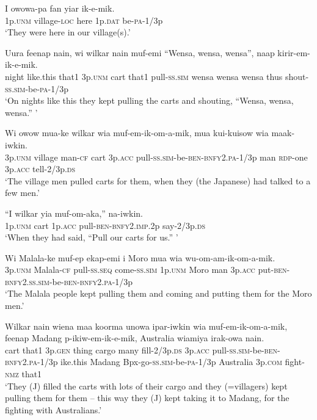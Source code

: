 \ea
\gll  I  owowa-pa  fan  yiar  ik-e-mik. \\
1p.\textsc{unm}  village-\textsc{loc}  here  1p.\textsc{dat}  be-\textsc{pa}-1/3p \\
\glt ‘They were here in our village(s).’ \\
\z


\ea
\gll  Uura  feenap  nain,  wi  wilkar  nain  muf-emi “Wensa,  wensa,  wensa”,  naap  kirir-em-ik-e-mik.\\
night  like.this  that1  3p.\textsc{unm}  cart  that1  pull-\textsc{ss}.\textsc{sim} wensa  wensa  wensa  thus  shout-\textsc{ss}.\textsc{sim}-be-\textsc{pa}-1/3p \\ 
\glt ‘On nights like this they kept pulling the carts and shouting, “Wensa, wensa, wensa.” ’ \\
\z


\ea
\gll  Wi  owow  mua-ke  wilkar  wia muf-em-ik-om-a-mik,  mua  kui-kuisow wia  maak-iwkin.\\
3p.\textsc{unm}  village  man-\textsc{cf}  cart  3p.\textsc{acc} pull-\textsc{ss}.\textsc{sim}-be-\textsc{ben}-\textsc{bnfy}2.\textsc{pa}-1/3p  man  \textsc{rdp}-one 3p.\textsc{acc}  tell-2/3p.\textsc{ds}\\ 
\glt ‘The village men pulled carts for them, when they (the Japanese) had talked to a few men.’ \\
\z


\ea
\gll  “I  wilkar  yia  muf-om-aka,”  na-iwkin. \\
1p.\textsc{unm}  cart  1p.\textsc{acc}  pull-\textsc{ben}-\textsc{bnfy}2.\textsc{imp}.2p  say-2/3p.\textsc{ds} \\
\glt ‘When they had said, “Pull our carts for us.” ’ \\
\z


\ea
\gll  Wi  Malala-ke  muf-ep  ekap-emi  i  Moro mua  wia  wu-om-am-ik-om-a-mik.\\
3p.\textsc{unm}  Malala-\textsc{cf}  pull-\textsc{ss.seq}  come-\textsc{ss}.\textsc{sim}  1p.\textsc{unm}  Moro man  3p.\textsc{acc}  put-\textsc{ben}-\textsc{bnfy}2.\textsc{ss}.\textsc{sim}-be-\textsc{ben}-\textsc{bnfy}2.\textsc{pa}-1/3p \\ 
\glt ‘The Malala people kept pulling them and coming and putting them for the Moro men.’ \\
\z


\ea
\gll  Wilkar  nain  wiena  maa  koorma  unowa  ipar-iwkin wia  muf-em-ik-om-a-mik, feenap  Madang  p-ikiw-em-ik-e-mik, Australia  wiamiya  irak-owa  nain. \\
cart  that1  3p.\textsc{gen}  thing  cargo  many  fill-2/3p.\textsc{ds} 3p.\textsc{acc}  pull-\textsc{ss}.\textsc{sim}-be-\textsc{ben}-\textsc{bnfy}2.\textsc{pa}-1/3p ike.this  Madang  Bpx-go-\textsc{ss}.\textsc{sim}-be-\textsc{pa}-1/3p Australia  3p.\textsc{com}  fight-\textsc{nmz}  that1\\ 
\glt ‘They (J) filled the carts with lots of their cargo and they (=villagers) kept pulling them for them  – this way they (J) kept taking it to Madang, for the fighting with Australians.’ \\
\z


